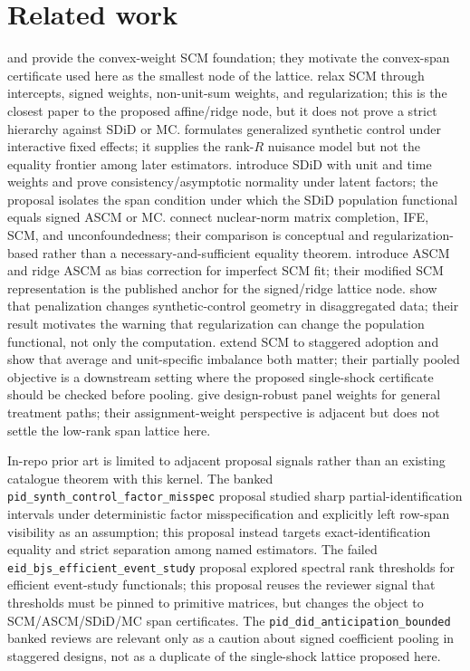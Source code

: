 \documentclass[11pt]{article}
\theoremstyle{definition}
\theoremstyle{plain}
\theoremstyle{remark}
\begin{document}
\section{Related work}
\citet{AbadieGardeazabal2003} and \citet{AbadieDiamondHainmueller2010}
provide the convex-weight SCM foundation; they motivate the convex-span
certificate used here as the smallest node of the lattice.
\citet{DoudchenkoImbens2016} relax SCM through intercepts, signed weights,
non-unit-sum weights, and regularization; this is the closest paper to the
proposed affine/ridge node, but it does not prove a strict hierarchy against
SDiD or MC.
\citet{Xu2017} formulates generalized synthetic control under interactive
fixed effects; it supplies the rank-$R$ nuisance model but not the equality
frontier among later estimators.
\citet{ArkhangelskyAtheyHirshbergImbensWager2021} introduce SDiD with unit and
time weights and prove consistency/asymptotic normality under latent factors;
the proposal isolates the span condition under which the SDiD population
functional equals signed ASCM or MC.
\citet{AtheyBayatiDoudchenkoImbensKhosravi2021} connect nuclear-norm matrix
completion, IFE, SCM, and unconfoundedness; their comparison is conceptual and
regularization-based rather than a necessary-and-sufficient equality theorem.
\citet{BenMichaelFellerRothstein2021} introduce ASCM and ridge ASCM as bias
correction for imperfect SCM fit; their modified SCM representation is the
published anchor for the signed/ridge lattice node.
\citet{AbadieLHour2021} show that penalization changes synthetic-control
geometry in disaggregated data; their result motivates the warning that
regularization can change the population functional, not only the computation.
\citet{BenMichaelFellerRothstein2022} extend SCM to staggered adoption and
show that average and unit-specific imbalance both matter; their partially
pooled objective is a downstream setting where the proposed single-shock
certificate should be checked before pooling.
\citet{ArkhangelskyImbensLeiLuo2024} give design-robust panel weights for
general treatment paths; their assignment-weight perspective is adjacent but
does not settle the low-rank span lattice here.

In-repo prior art is limited to adjacent proposal signals rather than an
existing catalogue theorem with this kernel. The banked
\texttt{pid\_synth\_control\_factor\_misspec} proposal studied sharp
partial-identification intervals under deterministic factor misspecification
and explicitly left row-span visibility as an assumption; this proposal instead
targets exact-identification equality and strict separation among named
estimators. The failed \texttt{eid\_bjs\_efficient\_event\_study} proposal
explored spectral rank thresholds for efficient event-study functionals; this
proposal reuses the reviewer signal that thresholds must be pinned to primitive
matrices, but changes the object to SCM/ASCM/SDiD/MC span certificates.
The \texttt{pid\_did\_anticipation\_bounded} banked reviews are relevant only
as a caution about signed coefficient pooling in staggered designs, not as a
duplicate of the single-shock lattice proposed here.
\end{document}
